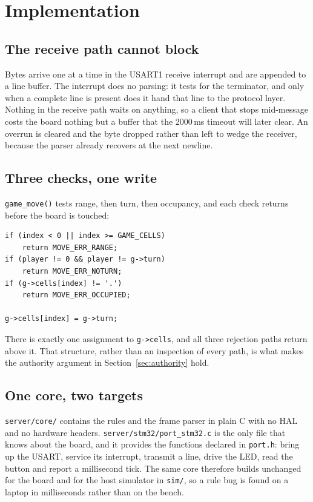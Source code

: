 \section{Implementation}
\label{sec:impl}

\subsection{The receive path cannot block}
Bytes arrive one at a time in the USART1 receive interrupt and are appended to
a line buffer. The interrupt does no parsing: it tests for the terminator, and
only when a complete line is present does it hand that line to the protocol
layer. Nothing in the receive path waits on anything, so a client that stops
mid-message costs the board nothing but a buffer that the 2000\,ms timeout will
later clear. An overrun is cleared and the byte dropped rather than left to
wedge the receiver, because the parser already recovers at the next newline.

\subsection{Three checks, one write}
\texttt{game\_move()} tests range, then turn, then occupancy, and each check
returns before the board is touched:

\begin{verbatim}
if (index < 0 || index >= GAME_CELLS)
    return MOVE_ERR_RANGE;
if (player != 0 && player != g->turn)
    return MOVE_ERR_NOTURN;
if (g->cells[index] != '.')
    return MOVE_ERR_OCCUPIED;

g->cells[index] = g->turn;
\end{verbatim}

There is exactly one assignment to \texttt{g->cells}, and all three rejection
paths return above it. That structure, rather than an inspection of every path,
is what makes the authority argument in Section~\ref{sec:authority} hold.

\subsection{One core, two targets}
\texttt{server/core/} contains the rules and the frame parser in plain C with
no HAL and no hardware headers. \texttt{server/stm32/port\_stm32.c} is the only
file that knows about the board, and it provides the functions declared in
\texttt{port.h}: bring up the USART, service its interrupt, transmit a line,
drive the LED, read the button and report a millisecond tick. The same core
therefore builds unchanged for the board and for the host simulator in
\texttt{sim/}, so a rule bug is found on a laptop in milliseconds rather than
on the bench.

